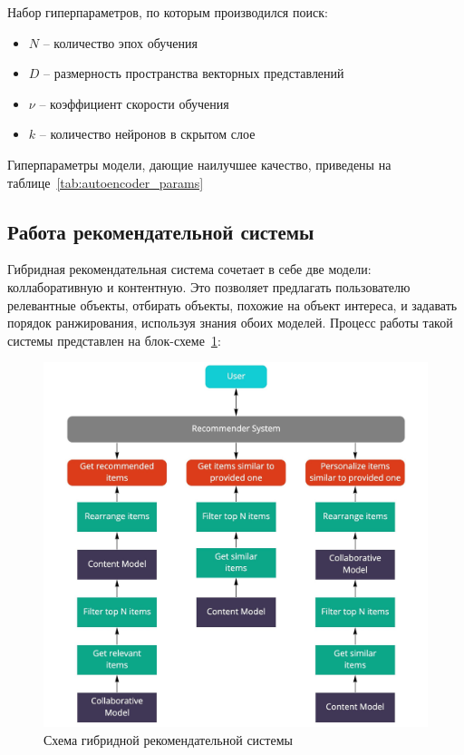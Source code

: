 \pagebreak
Набор гиперпараметров, по которым производился поиск:
\begin{itemize}
    \item $N$ -- количество эпох обучения
    \item $D$ -- размерность пространства векторных представлений
    \item $\nu$ -- коэффициент скорости обучения
    \item $k$ -- количество нейронов в скрытом слое
\end{itemize}

Гиперпараметры модели, дающие наилучшее качество, приведены на таблице~\ref{tab:autoencoder_params}
\begin{table}[h]
    \caption{Гиперпараметры автоэнкодера}
    \label{tab:autoencoder_params}
\end{table}

\pagebreak
\subsection{Работа рекомендательной системы}\label{subsec:recommendations_obtaining}
Гибридная рекомендательная система сочетает в себе две модели: коллаборативную и контентную.
Это позволяет предлагать пользователю релевантные объекты, отбирать объекты, похожие на объект интереса, и задавать порядок ранжирования, используя знания обоих моделей.
Процесс работы такой системы представлен на блок-схеме~\ref{fig:hybrid_system_diagram}:

\vspace{1em}
\begin{figure}[h!]
\centering
\begin{minipage}{0.9\textwidth}
\centering
\includegraphics[width=0.9\linewidth]{images/hybrid_system_diagram}
\caption{Схема гибридной рекомендательной системы}
\label{fig:hybrid_system_diagram}
\end{minipage}
\end{figure}
